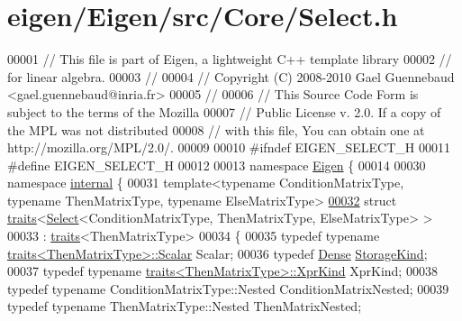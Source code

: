 \hypertarget{eigen_2_eigen_2src_2_core_2_select_8h_source}{}\section{eigen/\+Eigen/src/\+Core/\+Select.h}
\label{eigen_2_eigen_2src_2_core_2_select_8h_source}

\begin{DoxyCode}
00001 \textcolor{comment}{// This file is part of Eigen, a lightweight C++ template library}
00002 \textcolor{comment}{// for linear algebra.}
00003 \textcolor{comment}{//}
00004 \textcolor{comment}{// Copyright (C) 2008-2010 Gael Guennebaud <gael.guennebaud@inria.fr>}
00005 \textcolor{comment}{//}
00006 \textcolor{comment}{// This Source Code Form is subject to the terms of the Mozilla}
00007 \textcolor{comment}{// Public License v. 2.0. If a copy of the MPL was not distributed}
00008 \textcolor{comment}{// with this file, You can obtain one at http://mozilla.org/MPL/2.0/.}
00009 
00010 \textcolor{preprocessor}{#ifndef EIGEN\_SELECT\_H}
00011 \textcolor{preprocessor}{#define EIGEN\_SELECT\_H}
00012 
00013 \textcolor{keyword}{namespace }\hyperlink{namespace_eigen}{Eigen} \{ 
00014 
00030 \textcolor{keyword}{namespace }\hyperlink{namespaceinternal}{internal} \{
00031 \textcolor{keyword}{template}<\textcolor{keyword}{typename} ConditionMatrixType, \textcolor{keyword}{typename} ThenMatrixType, \textcolor{keyword}{typename} ElseMatrixType>
\hyperlink{struct_eigen_1_1internal_1_1traits_3_01_select_3_01_condition_matrix_type_00_01_then_matrix_type4a832542e824e444643efa2ac02419b2}{00032} \textcolor{keyword}{struct }\hyperlink{struct_eigen_1_1internal_1_1traits}{traits}<\hyperlink{group___core___module_class_eigen_1_1_select}{Select}<ConditionMatrixType, ThenMatrixType, ElseMatrixType> >
00033  : \hyperlink{struct_eigen_1_1internal_1_1traits}{traits}<ThenMatrixType>
00034 \{
00035   \textcolor{keyword}{typedef} \textcolor{keyword}{typename} \hyperlink{struct_eigen_1_1internal_1_1traits}{traits<ThenMatrixType>::Scalar} Scalar;
00036   \textcolor{keyword}{typedef} \hyperlink{struct_eigen_1_1_dense}{Dense} \hyperlink{struct_eigen_1_1_dense}{StorageKind};
00037   \textcolor{keyword}{typedef} \textcolor{keyword}{typename} \hyperlink{struct_eigen_1_1internal_1_1traits}{traits<ThenMatrixType>::XprKind} XprKind;
00038   \textcolor{keyword}{typedef} \textcolor{keyword}{typename} ConditionMatrixType::Nested ConditionMatrixNested;
00039   \textcolor{keyword}{typedef} \textcolor{keyword}{typename} ThenMatrixType::Nested ThenMatrixNested;

\end{DoxyCode}
